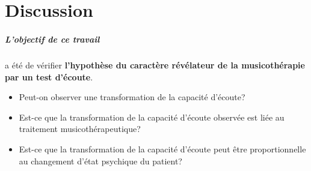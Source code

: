  
  
  
 
\chapter{Discussion}
\label{Conclusions}



 
\paragraph{L'objectif de ce travail} a été de vérifier\textbf{ l'hypothèse du caractère
	révélateur de la musicothérapie par un  test
	d'écoute}. %
	


 


\begin{itemize}
	
	\item Peut-on observer une transformation de la capacité d'écoute?
	\item Est-ce que la transformation de la capacité d'écoute observée est liée
	au traitement musicothérapeutique?
	\item Est-ce que la transformation de la capacité d'écoute peut être proportionnelle au 
	changement d'état psychique du patient?
\end{itemize}





